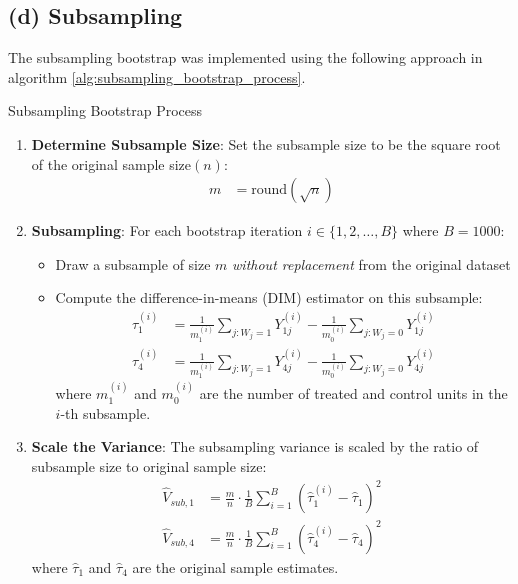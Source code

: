 \documentclass[11pt]{article}
\numberwithin{equation}{section}
\begin{document}
\newpage

\subsection{(d) Subsampling}

The subsampling bootstrap was implemented using the following approach in algorithm \ref{alg:subsampling_bootstrap_process}.


\begin{algorithm}
    \caption{Subsampling Bootstrap Process}
    \label{alg:subsampling_bootstrap_process}
    \begin{enumerate}
        \item \textbf{Determine Subsample Size}: Set the subsample size to be the square root of the original sample size$(n)$:
        \begin{align}
            m &= \text{round}(\sqrt{n})
        \end{align}
        
        \item \textbf{Subsampling}: For each bootstrap iteration $i \in \{1, 2, \ldots, B\}$ where $B = 1000$:
        \begin{itemize}
            \item Draw a subsample of size $m$ \textit{without replacement} from the original dataset
            \item Compute the difference-in-means (DIM) estimator on this subsample:
            \begin{align}
                \hat{\tau}^{(i)}_1 &= \frac{1}{m^{(i)}_1} \sum_{j: W_j = 1} Y_{1j}^{(i)} - \frac{1}{m^{(i)}_0} \sum_{j: W_j = 0} Y_{1j}^{(i)} \\
                \hat{\tau}^{(i)}_4 &= \frac{1}{m^{(i)}_1} \sum_{j: W_j = 1} Y_{4j}^{(i)} - \frac{1}{m^{(i)}_0} \sum_{j: W_j = 0} Y_{4j}^{(i)}
            \end{align}
            where $m^{(i)}_1$ and $m^{(i)}_0$ are the number of treated and control units in the $i$-th subsample.
        \end{itemize}
        
        \item \textbf{Scale the Variance}: The subsampling variance is scaled by the ratio of subsample size to original sample size:
        \begin{align}
            \hat{V}_{sub,1} &= \frac{m}{n} \cdot \frac{1}{B} \sum_{i=1}^B \left(\hat{\tau}^{(i)}_1 - \hat{\tau}_1\right)^2 \\
            \hat{V}_{sub,4} &= \frac{m}{n} \cdot \frac{1}{B} \sum_{i=1}^B \left(\hat{\tau}^{(i)}_4 - \hat{\tau}_4\right)^2
        \end{align}
        where $\hat{\tau}_1$ and $\hat{\tau}_4$ are the original sample estimates.
        

\end{enumerate}
\end{algorithm}
\end{document}
